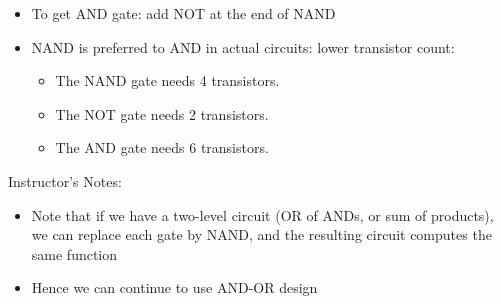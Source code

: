 \begin{frame}[fragile]
\begin{itemize}
\item To get AND gate: add NOT at the end of NAND
 \item NAND is preferred to AND in actual circuits: lower transistor count:
 \begin{itemize}
\item The NAND gate needs 4 transistors.
\item The NOT gate needs 2 transistors.
\item The AND gate needs 6 transistors.
\end{itemize}
\end{itemize}
\end{frame}
\BNotes\ifnum{}
\begin{frame}[fragile]
Instructor's Notes:
\begin{itemize}
\item Note that if we have a two-level circuit (OR of ANDs, or sum of products), we can replace each gate by NAND, and the resulting circuit computes the same function
\item Hence we can continue to use AND-OR design
\end{itemize}
\end{frame}
\fi\ENotes





